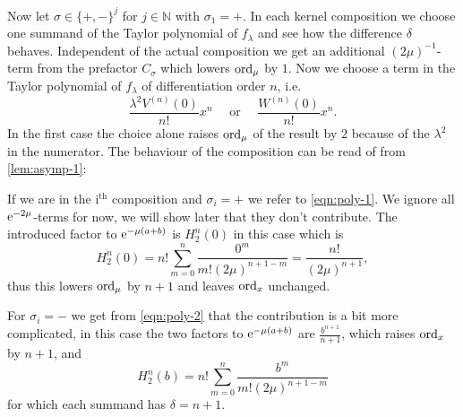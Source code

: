 \begin{MainTheorem}
\begin{Proof}
    Now let $\sigma\in\{+,-\}^j$ for $j\in\mathbb{N}$ with $\sigma_1 = +$. In
    each kernel composition we choose one summand of the Taylor polynomial of
    $f_\lambda$ and see how the difference $\delta$ behaves.  Independent of the
    actual composition we get an additional $(2\mu)^{-1}$-term from the
    prefactor $C_\sigma$ which lowers $\operatorname{ord}_\mu$ by $1$. Now we choose a term in
    the Taylor polynomial of $f_\lambda$ of differentiation order $n$, i.e.\ 
    \begin{equation*}
      \frac{\lambda^2 V^{(n)}(0)}{n!} x^n \quad \text{ or } \quad
      \frac{W^{(n)}(0)}{n!}x^n.
    \end{equation*}
    In the first case the choice alone raises $\operatorname{ord}_\mu$ of the result by $2$
    because of the $\lambda^2$ in the numerator. The behaviour of the
    composition can be read of from \cref{lem:asymp-1}:
    
    If we are in the i$^{\text{th}}$ composition and $\sigma_i = +$ we refer to
    \cref{eqn:poly-1}. We ignore all $\mathrm e^{-2\mu}$-terms for now, we will show
    later that they don't contribute. The introduced factor to $\mathrm e^{-\mu(a+b)}$
    is $H^n_2(0)$ in this case which is
    \begin{equation*}
      H^n_2(0) = n! \sum_{m=0}^n \frac{0^m}{m!(2\mu)^{n+1-m}} =
      \frac{n!}{(2\mu)^{n+1}},
    \end{equation*}
    thus this lowers $\operatorname{ord}_\mu$ by $n+1$ and leaves $\operatorname{ord}_x$ unchanged.

    For $\sigma_i = -$ we get from \cref{eqn:poly-2} that the contribution is a
    bit more complicated, in this case the two factors to $\mathrm e^{-\mu(a+b)}$ are
    $\frac{b^{n+1}}{n+1}$, which raises $\operatorname{ord}_x$ by $n+1$, and
    \begin{equation*}
      H^n_2(b) = n! \sum_{m=0}^n \frac{b^m}{m!(2\mu)^{n+1-m}}
    \end{equation*}
    for which each summand has $\delta = n+1$.


\end{Proof}
\end{MainTheorem}
